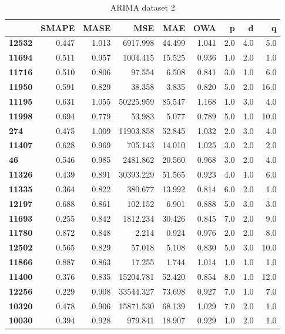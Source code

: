 \begin{table}[ht]
  \centering
  \caption{ARIMA dataset 2}
  \label{table:experiment_arima_dataset2}
  \begin{tabular}{lrrrrrrrr}
    \toprule
    {}             & SMAPE & MASE  & MSE       & MAE    & OWA   & p   & d   & q    \\
    \midrule
    \textbf{12532} & 0.447 & 1.013 & 6917.998  & 44.499 & 1.041 & 2.0 & 4.0 & 5.0  \\
    \textbf{11694} & 0.511 & 0.957 & 1004.415  & 15.525 & 0.936 & 1.0 & 2.0 & 1.0  \\
    \textbf{11716} & 0.510 & 0.806 & 97.554    & 6.508  & 0.841 & 3.0 & 1.0 & 6.0  \\
    \textbf{11950} & 0.591 & 0.829 & 38.358    & 3.835  & 0.820 & 5.0 & 2.0 & 16.0 \\
    \textbf{11195} & 0.631 & 1.055 & 50225.959 & 85.547 & 1.168 & 1.0 & 3.0 & 4.0  \\
    \textbf{11998} & 0.694 & 0.779 & 53.983    & 5.077  & 0.789 & 5.0 & 1.0 & 10.0 \\
    \textbf{274  } & 0.475 & 1.009 & 11903.858 & 52.845 & 1.032 & 2.0 & 3.0 & 4.0  \\
    \textbf{11407} & 0.628 & 0.969 & 705.143   & 14.010 & 1.025 & 3.0 & 2.0 & 2.0  \\
    \textbf{46   } & 0.546 & 0.985 & 2481.862  & 20.560 & 0.968 & 3.0 & 2.0 & 4.0  \\
    \textbf{11326} & 0.439 & 0.891 & 30393.229 & 51.565 & 0.923 & 4.0 & 1.0 & 6.0  \\
    \textbf{11335} & 0.364 & 0.822 & 380.677   & 13.992 & 0.814 & 6.0 & 2.0 & 1.0  \\
    \textbf{12197} & 0.688 & 0.861 & 102.152   & 6.901  & 0.888 & 5.0 & 3.0 & 3.0  \\
    \textbf{11693} & 0.255 & 0.842 & 1812.234  & 30.426 & 0.845 & 7.0 & 2.0 & 9.0  \\
    \textbf{11780} & 0.872 & 0.848 & 2.214     & 0.924  & 0.976 & 2.0 & 2.0 & 8.0  \\
    \textbf{12502} & 0.565 & 0.829 & 57.018    & 5.108  & 0.830 & 5.0 & 3.0 & 10.0 \\
    \textbf{11866} & 0.887 & 0.863 & 17.255    & 1.744  & 1.014 & 1.0 & 1.0 & 1.0  \\
    \textbf{11400} & 0.376 & 0.835 & 15204.781 & 52.420 & 0.854 & 8.0 & 1.0 & 12.0 \\
    \textbf{12256} & 0.229 & 0.908 & 33544.327 & 73.698 & 0.927 & 7.0 & 1.0 & 7.0  \\
    \textbf{10320} & 0.478 & 0.906 & 15871.530 & 68.139 & 1.029 & 7.0 & 2.0 & 1.0  \\
    \textbf{10030} & 0.394 & 0.928 & 979.841   & 18.907 & 0.929 & 1.0 & 2.0 & 1.0  \\
    \bottomrule
  \end{tabular}
\end{table}
